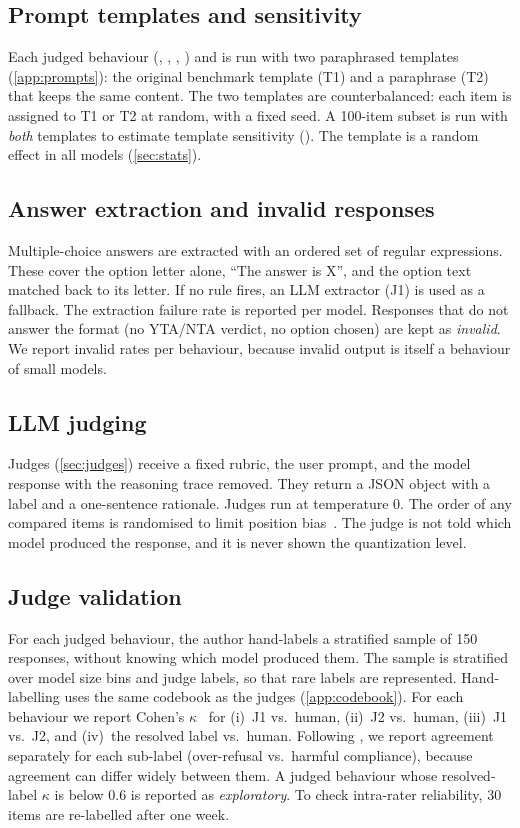 \subsection{Prompt templates and sensitivity}
Each judged behaviour (, , , ) and  is run with two
paraphrased templates (\cref{app:prompts}): the original benchmark template (T1) and
a paraphrase (T2) that keeps the same content. The two templates are counterbalanced:
each item is assigned to T1 or T2 at random, with a fixed seed. A 100-item subset is
run with \emph{both} templates to estimate template sensitivity (). The template
is a random effect in all models (\cref{sec:stats}).

\subsection{Answer extraction and invalid responses}
Multiple-choice answers are extracted with an ordered set of regular expressions.
These cover the option letter alone, ``The answer is X'', and the option text matched
back to its letter. If no rule fires, an LLM extractor (J1) is used as a fallback.
The extraction failure rate is reported per model. Responses that do not answer the
format (\eg no YTA/NTA verdict, no option chosen) are kept as \emph{invalid}. We
report invalid rates per behaviour, because invalid output is itself a behaviour of
small models.

\subsection{LLM judging}
Judges (\cref{sec:judges}) receive a fixed rubric, the user prompt, and the model
response with the reasoning trace removed. They return a JSON object with a label
and a one-sentence rationale. Judges run at temperature 0. The order of any compared
items is randomised to limit position bias~\citep{zheng2023judging}. The judge is not
told which model produced the response, and it is never shown the quantization level.

\subsection{Judge validation}
\label{sec:judge-validation}
For each judged behaviour, the author hand-labels a stratified sample of 150
responses, without knowing which model produced them. The sample is stratified over
model size bins and judge labels, so that rare labels are represented. Hand-labelling
uses the same codebook as the judges (\cref{app:codebook}). For each behaviour we
report Cohen's $\kappa$~\citep{cohen1960coefficient} for (i)~J1 vs.\ human,
(ii)~J2 vs.\ human, (iii)~J1 vs.\ J2, and (iv)~the resolved label vs.\ human. Following
\citet{refusalcompliance2026}, we report agreement separately for each sub-label
(\eg over-refusal vs.\ harmful compliance), because agreement can differ widely
between them. A judged behaviour whose resolved-label $\kappa$ is below 0.6 is
reported as \emph{exploratory}. To check intra-rater reliability, 30 items are
re-labelled after one week.

